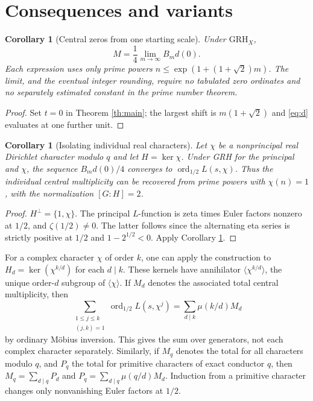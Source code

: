 \documentclass[11pt]{article}
\newtheorem{corollary}[theorem]{Corollary}
\theoremstyle{remark}\newtheorem{remark}[theorem]{Remark}
\newcommand{\ord}{\operatorname{ord}}
\newcommand{\GRH}{\mathrm{GRH}}
\begin{document}
\section{Consequences and variants}
\begin{corollary}[Central zeros from one starting scale]\label{cor:one}
Under $\GRH_X$,
\[
 M=\frac14\lim_{m\to\infty}B_m d(0).
\]
Each expression uses only prime powers $n\le\exp(1+(1+\sqrt2)m)$. The limit, and the eventual integer rounding, require no tabulated zero ordinates and no separately estimated constant in the prime number theorem.
\end{corollary}
\begin{proof}
Set $t=0$ in Theorem \ref{th:main}; the largest shift is $m(1+\sqrt2)$ and \eqref{eq:d} evaluates at one further unit.
\end{proof}

\begin{corollary}[Isolating individual real characters]\label{cor:real}
Let $\chi$ be a nonprincipal real Dirichlet character modulo $q$ and let $H=\ker\chi$. Under GRH for the principal and $\chi$, the sequence $B_m d(0)/4$ converges to $\ord_{1/2}L(s,\chi)$. Thus the individual central multiplicity can be recovered from prime powers with $\chi(n)=1$, with the normalization $[G:H]=2$.
\end{corollary}
\begin{proof}
$H^\perp=\{1,\chi\}$. The principal $L$-function is zeta times Euler factors nonzero at $1/2$, and $\zeta(1/2)\ne0$. The latter follows since the alternating eta series is strictly positive at $1/2$ and $1-2^{1/2}<0$. Apply Corollary \ref{cor:one}.
\end{proof}

For a complex character $\chi$ of order $k$, one can apply the construction to $H_d=\ker(\chi^{k/d})$ for each $d\mid k$. These kernels have annihilator $\langle\chi^{k/d}\rangle$, the unique order-$d$ subgroup of $\langle\chi\rangle$. If $M_d$ denotes the associated total central multiplicity, then
\[
 \sum_{\substack{1\le j\le k\\(j,k)=1}}\ord_{1/2} L(s,\chi^j)
 =\sum_{d\mid k}\mu(k/d) M_d
\]
by ordinary M\"obius inversion. This gives the sum over generators, not each complex character separately. Similarly, if $M_q$ denotes the total for all characters modulo $q$, and $P_q$ the total for primitive characters of exact conductor $q$, then $M_q=\sum_{d\mid q}P_d$ and $P_q=\sum_{d\mid q}\mu(q/d)M_d$. Induction from a primitive character changes only nonvanishing Euler factors at $1/2$.
\end{document}

